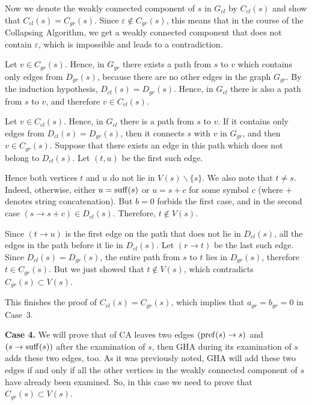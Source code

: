 Now we denote the weakly connected component of $ s $ in $ G_{cl} $ by $ C_{cl} (s) $ and show that $ C_{cl} (s) = C_{gr} (s) $. Since $ \varepsilon \notin C_{gr} (s) $, this means that in the course of the Collapsing Algorithm, we get a weakly connected component that does not contain $ \varepsilon $, which is impossible and leads to a contradiction.

Let $ v \in C_{gr} (s) $. Hence, in $ G_{gr} $ there exists a path from $ s $ to $ v $ which contains only edges from $ D_{gr} (s) $, because there are no other edges in the graph $G_{gr}$. By the induction hypothesis, $ D_{cl} (s) = D_{gr} (s) $. Hence, in $ G_{cl} $ there is also a path from $ s $ to $ v $, and therefore $ v \in C_{cl} (s) $.

Let $ v \in C_{cl} (s) $. Hence, in $ G_{cl} $ there is a path from $ s $ to $ v $. If it contains only edges from $ D_{cl} (s) = D_{gr} (s) $, then it connects $ s $ with $ v $ in $ G_{gr} $, and then $ v \in C_{gr} (s) $. Suppose that there exists an edge in this path which does not belong to $ D_{cl} (s) $. Let $(t, u)$ be the first such edge.

Hence both vertices $ t $ and $ u $ do not lie in $ V (s) \backslash \{s \} $. We also note that $ t \ne s $. Indeed, otherwise, either $ u = \operatorname{suff} (s) $ or $ u = s + c $ for some symbol $ c $ (where $+$ denotes string concatenation). But $ b = 0 $ forbids the first case, and in the second case $ (s \to s + c) \in D_{cl} (s) $. Therefore, $ t \notin V (s) $.

Since $ (t \to u) $ is the first edge on the path that does not lie in $ D_{cl} (s) $, all the edges in the path before it lie in $ D_{cl} (s) $. Let $ (r \to t) $ be the last such edge. Since $ D_{cl} (s) = D_{gr} (s) $, the entire path from $ s $ to $ t $ lies in $ D_{gr} (s) $, therefore $ t \in C_{gr} (s) $. But we just showed that $ t \notin V (s) $, which contradicts $ C_{gr} (s) \subset V (s) $.

This finishes the proof of $ C_{cl} (s) = C_{gr} (s) $, which implies that $a_{gr}=b_{gr}=0$ in Case~3.

\textbf {Case 4.} We will prove that of CA leaves two edges $ (\operatorname{pref} (s) \to s) $ and $ (s \to \operatorname{suff} (s)) $ after the examination of $ s $, then GHA during its examination of $ s $ adds these two edges, too. As it was previously noted, GHA will add these two edges if and only if all the other vertices in the weakly connected component of $ s $ have already been examined. So, in this case we need to prove that $ C_{gr} (s) \subset V (s) $.

